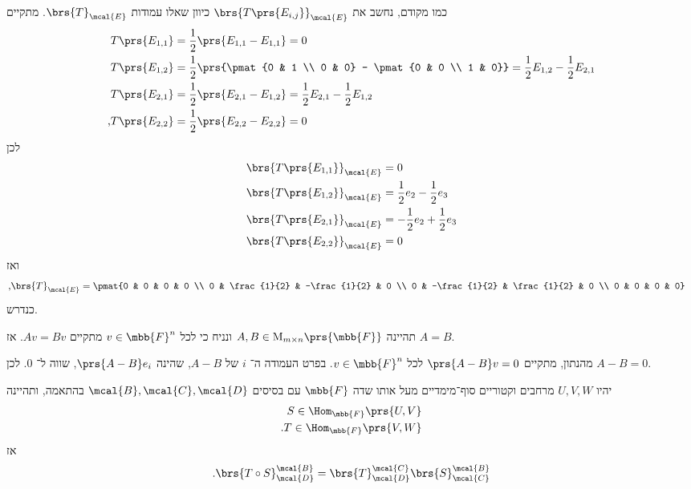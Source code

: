 \documentclass[a4paper,10pt,twoside,openany]{book}
\renewcommand{\Mat}{\mathrm{M}}
\begin{document}
\begin{solution}
כמו מקודם, נחשב את
$\brs{T\prs{E_{i,j}}}_\mcal{E}$
כיוון שאלו עמודות
$\brs{T}_\mcal{E}$.
מתקיים
\begin{align*}
T\prs{E_{1,1}} &= \frac{1}{2} \prs{E_{1,1} - E_{1,1}} = 0 \\
T\prs{E_{1,2}} &= \frac{1}{2} \prs{\pmat{0 & 1 \\ 0 & 0} - \pmat{0 & 0 \\ 1 & 0}} = \frac{1}{2} E_{1,2} - \frac{1}{2} E_{2,1} \\
T\prs{E_{2,1}} &= \frac{1}{2} \prs{E_{2,1} - E_{1,2}} = \frac{1}{2} E_{2,1} - \frac{1}{2} E_{1,2} \\
\text{,} T\prs{E_{2,2}} &= \frac{1}{2} \prs{E_{2,2} - E_{2,2}} = 0 \\
\end{align*}
לכן
\begin{align*}
\brs{T\prs{E_{1,1}}}_\mcal{E} &= 0 \\
\brs{T\prs{E_{1,2}}}_\mcal{E} &= \frac{1}{2} e_2 - \frac{1}{2} e_3 \\
\brs{T\prs{E_{2,1}}}_\mcal{E} &= -\frac{1}{2} e_2 + \frac{1}{2} e_3 \\
\brs{T\prs{E_{2,2}}}_\mcal{E} &= 0
\end{align*}
ואז
\begin{align*}
\text{,} \brs{T}_\mcal{E} &= \pmat{0 & 0 & 0 & 0 \\ 0 & \frac{1}{2} & -\frac{1}{2} & 0 \\ 0 & -\frac{1}{2} & \frac{1}{2} & 0 \\ 0 & 0 & 0 & 0}
\end{align*}
כנדרש.
\end{solution}

\begin{exercisechap}
תהיינה
$A,B \in \Mat_{m \times n}\prs{\mbb{F}}$
ונניח כי לכל
$v \in \mbb{F}^n$
מתקיים
$Av = Bv$.
אז
$A = B$.
\end{exercisechap}

\begin{solution}
מהנתון, מתקיים
$\prs{A - B}v = 0$
לכל
$v \in \mbb{F}^n$.
בפרט העמודה ה־%
$i$
של
$A-B$,
שהינה
$\prs{A - B}e_i$,
שווה ל־%
$0$.
לכן
$A - B = 0$.
\end{solution}

\begin{proposition}
יהיו
$U,V,W$
מרחבים וקטוריים סוף־מימדיים מעל אותו שדה
$\mbb{F}$
עם בסיסים
$\mcal{B},\mcal{C},\mcal{D}$
בהתאמה,
ותהיינה
\begin{align*}
S \in \Hom_{\mbb{F}}\prs{U,V} \\
\text{.} T \in \Hom_{\mbb{F}}\prs{V,W}
\end{align*}
אז
\[\text{.} \brs{T \circ S}^\mcal{B}_\mcal{D} = \brs{T}^\mcal{C}_\mcal{D} \brs{S}^\mcal{B}_\mcal{C}\]
\end{proposition}
\end{document}
